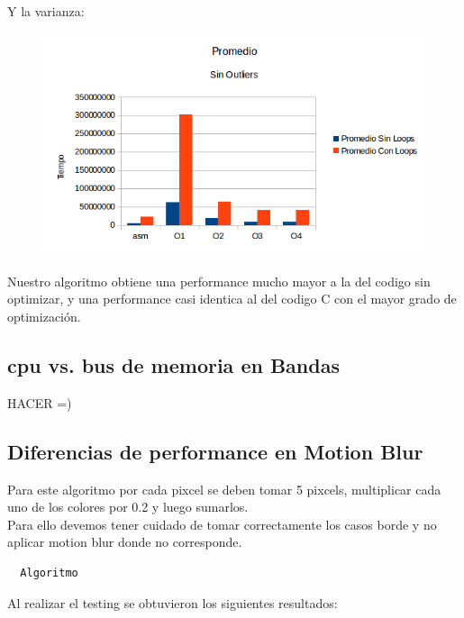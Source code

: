 \documentclass[a4paper]{article}
\begin{document}
\newpage
Y la varianza:

\begin{figure}[h!]
  \begin{center}
  \includegraphics[scale=0.66]{GraficosTesting/ban/PSO.png}
  \label{nombreparareferenciar10}
  \end{center}
\end{figure}

Nuestro algoritmo obtiene una performance mucho mayor a la del codigo sin optimizar, y una performance casi identica al del codigo C con el mayor grado de optimización.


\subsection{cpu vs. bus de memoria en Bandas}
HACER =)

\newpage

\subsection{Diferencias de performance en Motion Blur}
Para este algoritmo por cada pixcel se deben tomar 5 pixcels, multiplicar cada uno de los colores por 0.2 y luego sumarlos.
\\
Para ello devemos tener cuidado de tomar correctamente los casos borde y no aplicar motion blur donde no corresponde.

\begin{codesnippet}
\begin{verbatim}
  Algoritmo
\end{verbatim}
\end{codesnippet}

Al realizar el testing se obtuvieron los siguientes resultados:
\end{document}
